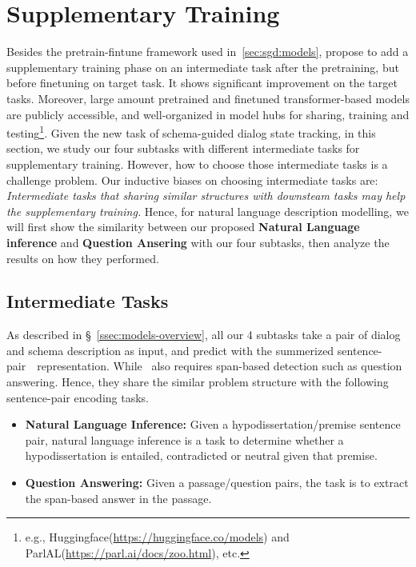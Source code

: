 \section{Supplementary Training}
\label{sec:sgd:sup-training}
Besides the pretrain-fintune framework used in~\autoref{sec:sgd:models},
\citet{phang2018sentence} propose to add a supplementary training
phase on an intermediate task after the pretraining, but before
finetuning on target task. It shows significant improvement on the
target tasks. Moreover, large amount pretrained and finetuned
transformer-based models are publicly accessible, and well-organized
in model hubs for sharing, training and testing\footnote{e.g.,
  Huggingface(\url{https://huggingface.co/models}) and
  ParlAL(\url{https://parl.ai/docs/zoo.html}), etc.}.  Given the new
task of schema-guided dialog state tracking, in this section, we study
our four subtasks with different intermediate tasks for supplementary
training. However, how to choose those intermediate tasks is a
challenge problem. Our inductive biases on choosing intermediate tasks
are: \textit{Intermediate tasks that sharing similar structures with
  downsteam tasks may help the supplementary training.}  Hence, for
natural language description modelling, we will first show the
similarity between our proposed \textbf{Natural Language inference}
and \textbf{Question Ansering} with our four subtasks, then analyze
the results on how they performed.

\subsection{Intermediate Tasks}
\label{ssec:intermediate-tasks}
As described in \S~\ref{ssec:models-overview}, all our 4
subtasks take a pair of dialog and schema description as input, and
predict with the summerized sentence-pair~\CLS~representation. While
\NSL~also requires span-based detection such as question
answering. Hence, they share the similar problem structure with the
following sentence-pair encoding tasks.
\begin{itemize}
\item \textbf{Natural Language Inference:} Given a hypodissertation/premise
sentence pair, natural language inference is a task to determine
whether a hypodissertation is entailed, contradicted or neutral given
that premise.

\item \textbf{Question Answering:} Given a passage/question pairs, the
task is to extract the span-based answer in the passage.
\end{itemize}

